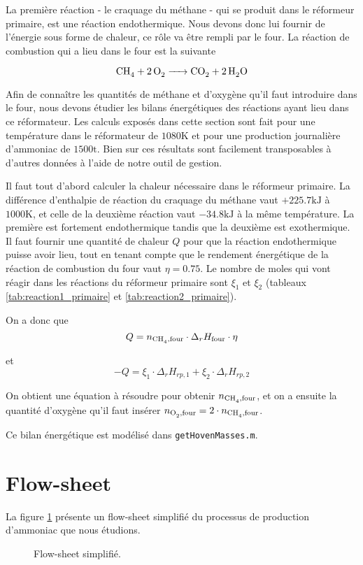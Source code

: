 \documentclass[a4paper, oneside, 12pt]{article}
\begin{document}
La première réaction - le craquage du méthane - qui se produit dans le réformeur primaire,
est une réaction endothermique. Nous devons donc lui fournir de l'énergie sous 
forme de chaleur, ce r\^ole va être rempli par le four. 
La réaction de combustion qui a lieu dans le four est la suivante

\[
	\ce{CH4 + 2O2 -> CO2 + 2H2O}
\]

Afin de connaître les quantités de méthane et d'oxygène qu'il faut
introduire dans le four, nous devons étudier les bilans énergétiques
des réactions ayant lieu dans ce réformateur. Les calculs exposés dans cette section 
sont fait pour une température dans le réformateur de $1080 \si{\kelvin}$
et pour une production journalière d'ammoniac de $1500 \si{\tonne}$. 
Bien sur ces résultats sont facilement transposables
à d'autres données à l'aide de notre outil de gestion.

Il faut tout d'abord calculer la chaleur nécessaire dans le réformeur primaire.
La différence d'enthalpie de réaction du craquage du méthane vaut $+225.7 \si{\kilo\joule}$
à $1000 \si{\kelvin}$, et celle de la deuxième réaction
vaut $-34.8 \si{\kilo\joule}$ à la même température.
La première est fortement endothermique tandis que la deuxième est exothermique.
Il faut fournir une quantité de chaleur $Q$ pour que la réaction endothermique
puisse avoir lieu, tout en tenant compte que le rendement énergétique de 
la réaction de combustion du four vaut $\eta = 0.75$.
Le nombre de moles qui vont réagir dans les réactions du réformeur primaire 
sont $\xi_1$ et $\xi_2$ (tableaux \ref{tab:reaction1_primaire} 
et \ref{tab:reaction2_primaire}).

On a donc que 
\[
	Q = n_{\ce{CH4},\text{four}} \cdot \Delta_r H_{\text{four}} \cdot \eta
\]

et 
\[
	-Q = \xi_1 \cdot \Delta_r H_{rp,1} + \xi_2 \cdot \Delta_r H_{rp,2}
\]

On obtient une équation à résoudre pour obtenir $n_{\ce{CH4},\text{four}}$, et on a ensuite
la quantité d'oxygène qu'il faut insérer $n_{\ce{O2},\text{four}} = 2 \cdot n_{\ce{CH4},\text{four}}$.

Ce bilan énergétique est modélisé dans \texttt{getHovenMasses.m}.

\section{Flow-sheet}
\label{sec:flow}

La figure \ref{fig:flow} présente un flow-sheet simplifié du processus 
de production d'ammoniac que nous étudions.

\begin{figure}[h!]
	\begin{center}
		
	\end{center}
	\caption{Flow-sheet simplifié.}
	\label{fig:flow}
\end{figure}

\printbibliography
\end{document}
